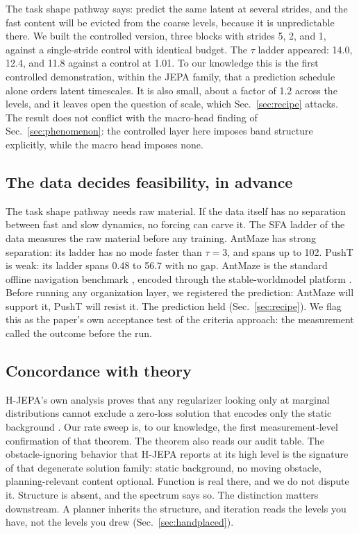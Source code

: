 \documentclass[11pt]{article}
\newcommand{\tauc}{\tau}
\begin{document}
The task shape pathway says: predict the same latent at several strides, and the fast content will be evicted from the coarse levels, because it is unpredictable there.
We built the controlled version, three blocks with strides 5, 2, and 1, against a single-stride control with identical budget.
The $\tauc$ ladder appeared: 14.0, 12.4, and 11.8 against a control at 1.01.
To our knowledge this is the first controlled demonstration, within the JEPA family, that a prediction schedule alone orders latent timescales.
It is also small, about a factor of 1.2 across the levels, and it leaves open the question of scale, which Sec.~\ref{sec:recipe} attacks.
The result does not conflict with the macro-head finding of Sec.~\ref{sec:phenomenon}: the controlled layer here imposes band structure explicitly, while the macro head imposes none.

\subsection{The data decides feasibility, in advance}
\label{sec:feasibility}

The task shape pathway needs raw material.
If the data itself has no separation between fast and slow dynamics, no forcing can carve it.
The SFA ladder of the data measures the raw material before any training.
AntMaze has strong separation: its ladder has no mode faster than $\tauc = 3$, and spans up to 102.
PushT is weak: its ladder spans 0.48 to 56.7 with no gap.
AntMaze is the standard offline navigation benchmark \citep{d4rl}, encoded through the stable-worldmodel platform \citep{swm}.
Before running any organization layer, we registered the prediction: AntMaze will support it, PushT will resist it.
The prediction held (Sec.~\ref{sec:recipe}).
We flag this as the paper's own acceptance test of the criteria approach: the measurement called the outcome before the run.

\subsection{Concordance with theory}
\label{sec:concordance}

H-JEPA's own analysis proves that any regularizer looking only at marginal distributions cannot exclude a zero-loss solution that encodes only the static background \citep{hjepa}.
Our rate sweep is, to our knowledge, the first measurement-level confirmation of that theorem.
The theorem also reads our audit table.
The obstacle-ignoring behavior that H-JEPA reports at its high level is the signature of that degenerate solution family: static background, no moving obstacle, planning-relevant content optional.
Function is real there, and we do not dispute it.
Structure is absent, and the spectrum says so.
The distinction matters downstream.
A planner inherits the structure, and iteration reads the levels you have, not the levels you drew (Sec.~\ref{sec:handplaced}).
\end{document}
